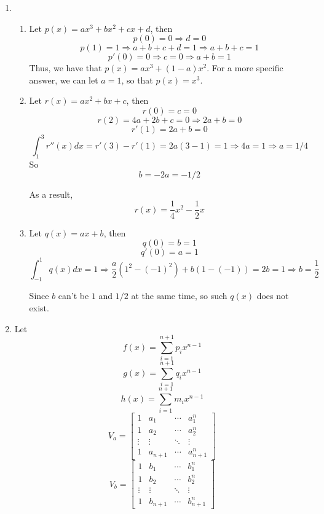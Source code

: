 \documentclass[11pt]{article}
\begin{document}
	\begin{enumerate}
		\item \begin{enumerate}
				\item 
				Let $p(x) = ax^3 + bx^2 + cx + d$, then
				\[p(0) = 0 \Rightarrow	d = 0\]
				\[p(1) = 1 \Rightarrow a + b + c + d = 1 \Rightarrow a + b + c = 1\]
				\[p'(0) = 0 \Rightarrow c = 0 \Rightarrow a + b = 1 \]
				Thus, we have that $p(x) = ax^3 + (1 - a)x^2$. For a more specific answer, we can let $a = 1$, so that $p(x) = x^3$.
				\item Let $r(x) = ax^2 + bx + c$, then
			 	\[r(0) = c = 0\]
			 	\[r(2) = 4a + 2b + c = 0 \Rightarrow 2a + b = 0\]
			 	\[r'(1) = 2a + b = 0\]
			 	\[\int_1^3 r''(x)dx = r'(3) - r'(1) = 2a(3 - 1) = 1 \Rightarrow 4a = 1 \Rightarrow a = 1/4 \]
			 	So
			 	\[b = -2a = -1/2\]
			 	
			 As a result, \[r(x) = \frac{1}{4}x^2 - \frac{1}{2	}x\]
			 \item Let $q(x) = ax + b$, then 
			 \[q(0) = b = 1\]
			 \[q'(0) = a = 1\]
			 \[\int_{-1}^1 q(x)dx = 1 \Rightarrow \frac{a}{2}(1^2 - (-1)^2) + b(1 - (-1)) = 2b = 1 \Rightarrow b = \frac{1}{2}\]
			 
			 Since $b$ can't be $1$ and $1/2$ at the same time, so such $q(x)$ does not exist.
			  \end{enumerate}
			 
			 \item 
			 Let 
			 \[f(x) = \sum_{i = 1}^{n + 1} p_i x^{n - 1}\]
			 \[g(x) = \sum_{i = 1}^{n + 1} q_i x^{n - 1}\]
			 \[h(x) = \sum_{i = 1}^{n + 1} m_i x^{n - 1}\]
			 \[V_a = \begin{bmatrix}
			 	1 & a_1 & \cdots & a_1^n\\
			 	1 & a_2 & \cdots & a_2^n\\
			 	\vdots & \vdots & \ddots & \vdots\\
			 	1 & a_{n + 1} & \cdots & a_{n + 1}^n
			 \end{bmatrix} \]
			 \[V_b = \begin{bmatrix}
			 	1 & b_1 & \cdots & b_1^n\\
			 	1 & b_2 & \cdots & b_2^n\\
			 	\vdots & \vdots & \ddots & \vdots\\
			 	1 & b_{n + 1} & \cdots & b_{n + 1}^n
			 \end{bmatrix} \]
			 

\end{enumerate}
\end{document}
